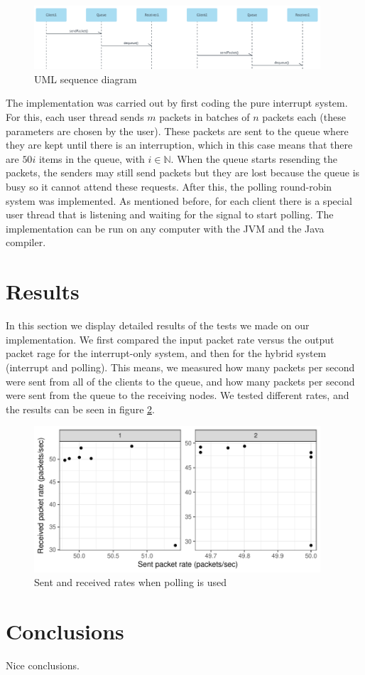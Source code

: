\documentclass{article}
\begin{document}
\begin{figure}[H]
    \centering
    \includegraphics[width=0.95\textwidth]{UML_seq_diagram.png}
    \caption{UML sequence diagram}
    \label{fig:uml_diagram}
\end{figure}

The implementation was carried out by first coding the pure interrupt system. For this, each user thread sends $m$ packets in batches of $n$ packets each (these parameters are chosen by the user). These packets are sent to the queue where they are kept until there is an interruption, which in this case means that there are $50i$ items in the queue, with $i \in \mathbb{N}$. When the queue starts resending the packets, the senders may still send packets but they are lost because the queue is busy so it cannot attend these requests. After this, the polling round-robin system was implemented. As mentioned before, for each client there is a special user thread that is listening and waiting for the signal to start polling. The implementation can be run on any computer with the JVM and the Java compiler.


\section{Results}

In this section we display detailed results of the tests we made on our implementation. We first compared the input packet rate versus the output packet rage for the interrupt-only system, and then for the hybrid system (interrupt and polling). This means, we measured how many packets per second were sent from all of the clients to the queue, and how many packets per second were sent from the queue to the receiving nodes. We tested different rates, and the results can be seen in figure \ref{fig:polling_rates}.

\begin{figure}[H]
    \centering
    \includegraphics[width=0.95\textwidth]{polling_rates.pdf}
    \caption{Sent and received rates when polling is used}
    \label{fig:polling_rates}
\end{figure}


\section{Conclusions}

Nice conclusions.


\printbibliography
\end{document}
